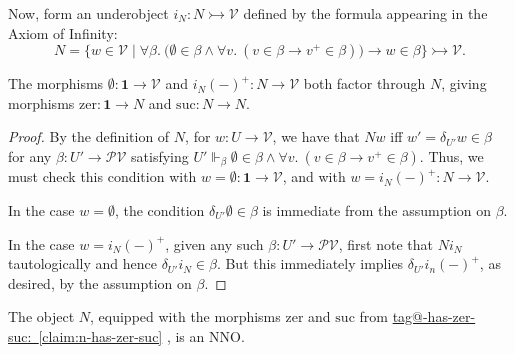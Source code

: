 \documentclass{amsart}
\makeatletter
\newcommand\cV{\mathcal{V}}
\newcommand\pbig[1]{\big({#1}\big)}
\newcommand\pow{\mathcal{P}}
\newcommand\set[2][]{#1\{ #2 #1\}}
\newcommand\suc{\mathrm{suc}}
\newcommand\tm{\mathbf{1}}
\newcommand\tto{\rightarrowtail}
\newcommand\zer{\mathrm{zer}}
\newcommand\tagword[1]{\csname tag@#1\endcsname}
\def\label@tag#1:#2\@nil{#1}
\newcommand\labeltag[1]{\label@tag#1:\@nil}
\newcommand\jref[1]{%
  \texorpdfstring%
    {\hyperref[#1]{\tagword{\labeltag{#1}}~\ref*{#1}}}%
    {\tagword{\labeltag{#1}}~\ref*{#1}}%
}
\theoremstyle{definition}
\theoremstyle{remark}
\theoremstyle{plainwithref}
\makeatother
\begin{document}
Now, form an underobject \( i_N \colon N \tto \cV \) defined by the formula appearing in the Axiom of Infinity:
\[
  N = \set{w \in \cV \mid \forall \beta.\ \pbig{\emptyset \in \beta \wedge \forall v.\ (v \in \beta \to v^+ \in \beta)} \to w \in \beta} \tto \cV.
\]
\begin{claim} \label{claim:n-has-zer-suc}
  The morphisms \( \emptyset \colon \tm \to \cV \) and \( i_N (-)^+ \colon N \to \cV \) both factor through \( N \), giving morphisms \( \zer \colon \tm \to N \) and \( \suc \colon N \to N \).
\end{claim}
\begin{proof}
  By the definition of \( N \), for \( w \colon U \to \cV \), we have that \( N w \) iff \( w' = \delta_{U'} w \in \beta \) for any \( \beta \colon U' \to \pow \cV \) satisfying \( U' \Vdash_\beta \emptyset \in \beta \wedge \forall v.\ (v \in \beta \to v^+ \in \beta) \).
  Thus, we must check this condition with \( w = \emptyset \colon \tm \to \cV \), and with \( w = i_N (-)^+ \colon N \to \cV \).

  In the case \( w = \emptyset \), the condition \( \delta_{U'} \emptyset \in \beta \) is immediate from the assumption on \( \beta \).

  In the case \( w = i_N (-)^+ \), given any such \( \beta \colon U' \to \pow \cV \), first note that \( N i_N \) tautologically and hence \( \delta_{U'} i_N \in \beta \).
  But this immediately implies \( \delta_{U'} i_n (-)^+ \), as desired, by the assumption on \( \beta \).
\end{proof}

\begin{claim}
  The object \( N \), equipped with the morphisms \( \zer \) and \( \suc \) from \jref{claim:n-has-zer-suc}, is an NNO.
\end{claim}
\end{document}
